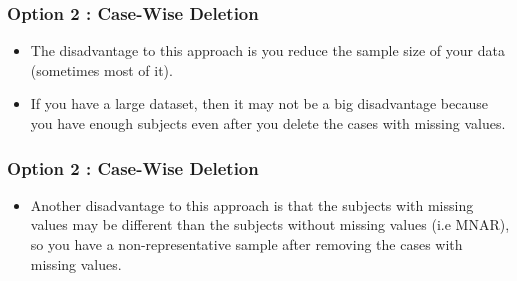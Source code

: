 \documentclass[MASTER.tex]{subfiles}
\begin{document}
	\begin{frame}
		\frametitle{Option 2 : Case-Wise Deletion}
		\Large
		\begin{itemize}
			\item		
		The disadvantage to this approach is you reduce the sample size of your data (sometimes most of it). 
		\item If you have a large dataset, then it may not be a big disadvantage because you have enough subjects even after you delete the cases with missing values.
\end{itemize}	
\end{frame}
	\begin{frame}
	\frametitle{Option 2 : Case-Wise Deletion}
	\Large
		\begin{itemize}
		\item Another disadvantage to this approach is that the subjects with missing values may be different than the subjects without missing values (i.e MNAR), so you have a non-representative sample after removing the cases with missing values.
		\end{itemize}

	\end{frame}
\end{document}
